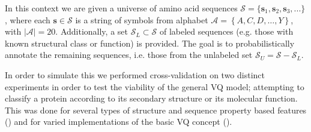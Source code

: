 In this context we are given a universe of amino acid sequences $\mathcal{S}=\{\mathbf{s}_{1},\mathbf{s}_{2},\mathbf{s}_{3},...\}$, where each $\mathbf{s}\in\mathcal{S}$ is a string of symbols from alphabet $\mathcal{A}=\left\{ A,C,D,\ldots,Y\right\} $, with $|\mathcal{A}|=20$. Additionally, a set $\mathcal{S}_{L}\subset\mathcal{S}$ of labeled sequences (e.g. those with known structural class or function) is provided. The goal is to probabilistically annotate the remaining sequences, i.e. those from the unlabeled set $\mathcal{S}_{U}=\mathcal{S}-\mathcal{S}_{L}$. 

In order to simulate this we performed cross-validation on two distinct experiments in order to test the viability of the general VQ model; attempting to classify a protein according to its secondary structure or its molecular function.  This was done for several types of structure and sequence property based features () and for varied implementations of the basic VQ concept ().





